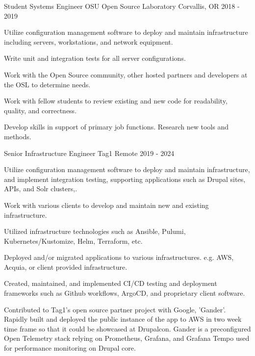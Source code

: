 \begin{cventries}
  \cventry
    {Student Systems Engineer} %
    {OSU Open Source Laboratory} %
    {Corvallis, OR} %
    {2018 - 2019} %
    {
      \begin{cvitems} %
         \item{Utilize configuration management software to deploy and maintain infrastructure including servers, workstations, and network equipment.}
         \item{Write unit and integration tests for all server configurations.}
         \item{Work with the Open Source community, other hosted partners and developers at the OSL to determine needs.}
         \item{Work with fellow students to review existing and new code for readability, quality, and correctness.}
         \item{Develop skills in support of primary job functions. Research new tools and methods.}
      \end{cvitems}
    }

  \cventry
    {Senior Infrastructure Engineer} %
    {Tag1} %
    {Remote} %
    {2019 - 2024} %
    {
      \begin{cvitems} %
         \item{Utilize configuration management software to deploy and maintain infrastructure, and implement integration testing, supporting applications such as Drupal sites, APIs, and Solr clusters,.}
         \item{Work with various clients to develop and maintain new and existing infrastructure.}
         \item{Utilized infrastructure technologies such as Ansible, Pulumi, Kubernetes/Kustomize, Helm, Terraform, etc.}
         \item{Deployed and/or migrated applications to various infrastructures. e.g. AWS, Acquia, or client provided infrastructure.}
         \item{Created, maintained, and implemented CI/CD testing and deployment frameworks such as Github workflows, ArgoCD, and proprietary client software.}
         \item{Contributed to Tag1's open source partner project with Google, 'Gander'. Rapidly built and deployed the public instance of the app to AWS in two week time frame so that it could be showcased at Drupalcon. Gander is a preconfigured Open Telemetry stack relying on Prometheus, Grafana, and Grafana Tempo used for performance monitoring on Drupal core.}
      \end{cvitems}
    }

\end{cventries}
